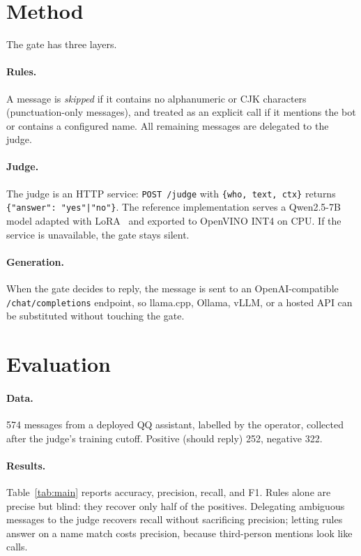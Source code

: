 ﻿\documentclass[11pt]{article}
\begin{document}
\section{Method}
The gate has three layers.

\paragraph{Rules.}
A message is \emph{skipped} if it contains no alphanumeric or CJK characters (punctuation-only messages), and treated as an explicit call if it mentions the bot or contains a configured name.
All remaining messages are delegated to the judge.

\paragraph{Judge.}
The judge is an HTTP service: \texttt{POST /judge} with \texttt{\{who, text, ctx\}} returns \texttt{\{"answer": "yes"|"no"\}}.
The reference implementation serves a Qwen2.5-7B~\citep{qwen25} model adapted with LoRA~\citep{lora} and exported to OpenVINO INT4 on CPU.
If the service is unavailable, the gate stays silent.

\paragraph{Generation.}
When the gate decides to reply, the message is sent to an OpenAI-compatible \texttt{/chat/completions} endpoint, so llama.cpp, Ollama, vLLM, or a hosted API can be substituted without touching the gate.

\section{Evaluation}
\paragraph{Data.}
574 messages from a deployed QQ assistant, labelled by the operator, collected after the judge's training cutoff.
Positive (should reply) 252, negative 322.

\paragraph{Results.}
Table~\ref{tab:main} reports accuracy, precision, recall, and F1.
Rules alone are precise but blind: they recover only half of the positives.
Delegating ambiguous messages to the judge recovers recall without sacrificing precision; letting rules answer on a name match costs precision, because third-person mentions look like calls.
\end{document}
